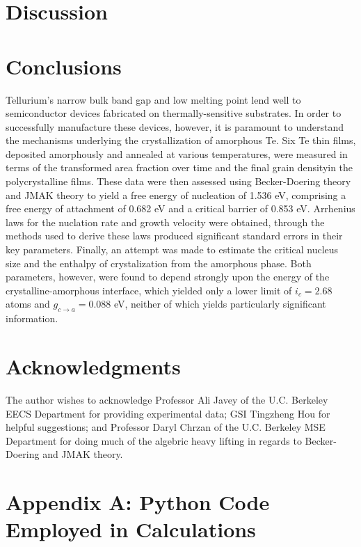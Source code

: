 \documentclass[12pt, titlepage]{article}
\begin{document}


\section{Discussion}



\section{Conclusions}

Tellurium's narrow bulk band gap and low melting point lend well to semiconductor devices fabricated on thermally-sensitive substrates.  In order to successfully manufacture these devices, however, it is paramount to understand the mechanisms underlying the crystallization of amorphous Te.  Six Te thin films, deposited amorphously and annealed at various temperatures, were measured in terms of the transformed area fraction over time and the final grain densityin the polycrystalline films.  These data were then assessed using Becker-Doering theory and JMAK theory to yield a free energy of nucleation of 1.536 eV, comprising a free energy of attachment of 0.682 eV and a critical barrier of 0.853 eV.  Arrhenius laws for the nuclation rate and growth velocity were obtained, through the methods used to derive these laws produced significant standard errors in their key parameters.  Finally, an attempt was made to estimate the critical nucleus size and the enthalpy of crystalization from the amorphous phase.  Both parameters, however, were found to depend strongly upon the energy of the crystalline-amorphous interface, which yielded only a lower limit of $i_c = 2.68$ atoms and $g_{c \rightarrow a} = 0.088$ eV, neither of which yields particularly significant information.

\section{Acknowledgments}

The author wishes to acknowledge Professor Ali Javey of the U.C. Berkeley EECS Department for providing experimental data; GSI Tingzheng Hou for helpful suggestions; and Professor Daryl Chrzan of the U.C. Berkeley MSE Department for doing much of the algebric heavy lifting in regards to Becker-Doering and JMAK theory.

\printbibliography[heading=bibnumbered]

\section{Appendix A: Python Code Employed in Calculations}
\end{document}
